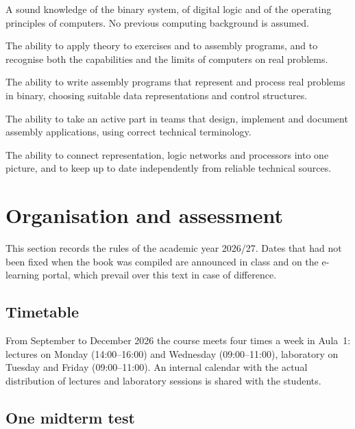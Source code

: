 \begin{description}[style=nextline,leftmargin=1.5em]
\item[Knowledge and understanding.] A sound knowledge of the binary system, of
  digital logic and of the operating principles of computers. No previous
  computing background is assumed.
\item[Applying knowledge.] The ability to apply theory to exercises and to
  \riscv assembly programs, and to recognise both the capabilities and the
  limits of computers on real problems.
\item[Making judgements.] The ability to write assembly programs that represent
  and process real problems in binary, choosing suitable data representations
  and control structures.
\item[Communication skills.] The ability to take an active part in teams that
  design, implement and document assembly applications, using correct
  technical terminology.
\item[Learning skills.] The ability to connect representation, logic networks
  and processors into one picture, and to keep up to date independently from
  reliable technical sources.
\end{description}

\section{Organisation and assessment}

This section records the rules of the academic year 2026/27. Dates that had
not been fixed when the book was compiled are announced in class and on the
e-learning portal, which prevail over this text in case of difference.

\subsection{Timetable}

From September to December 2026 the course meets four times a week in Aula~1:
lectures on Monday (14:00--16:00) and Wednesday (09:00--11:00), laboratory on
Tuesday and Friday (09:00--11:00). An internal calendar with the actual
distribution of lectures and laboratory sessions is shared with the students.

\subsection{One midterm test}

